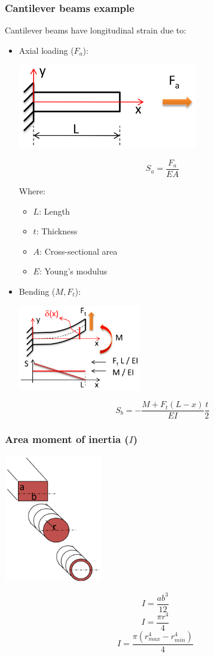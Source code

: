 \documentclass[11pt]{article}
\begin{document}
\subsubsection{Cantilever beams example}
\label{sec:orgfabf623}
Cantilever beams have longitudinal strain due to:
\begin{itemize}
\item Axial loading (\(F_a\)):
\begin{center}
\includegraphics[height=10em]{./images/axial-loaded-cantilever-beam.png}
\end{center}
\[S_a = \frac{F_a}{EA}\]

Where:
\begin{itemize}
\item \(L\): Length
\item \(t\): Thickness
\item \(A\): Cross-sectional area
\item \(E\): Young's modulus
\end{itemize}

\item Bending (\(M, F_t\)):
\begin{center}
\includegraphics[height=10em]{./images/bent-cantilever-beam.png}
\end{center}
\[S_b = - \frac{M + F_t (L - x)}{EI} \frac{t}{2}\]
\end{itemize}

 \newpage
\subsubsection{Area moment of inertia (\(I\))}
\label{sec:org3c06c7a}
\begin{center}
\includegraphics[height=15em]{./images/area-moment-of-inertia.png}
\end{center}
\[I = \frac{ab^3}{12}\]
\[I = \frac{\pi r^4}{4}\]
\[I = \frac{\pi (r_{max}^4 - r_{min}^4)}{4}\]
\end{document}
